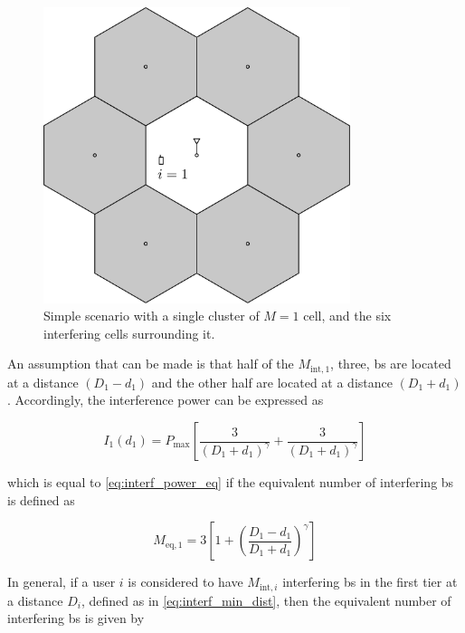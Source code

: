 \begin{figure}[t]
\begin{center}
    \includegraphics[width=0.8\textwidth]{./10.achievable_rates/img/cluster_1}
\end{center}
\caption{Simple scenario with a single cluster of $M = 1$ cell, and the six
    interfering cells surrounding it.}
\label{fig:cluster_1}
\end{figure}

An assumption that can be made is that half of the $M_{\text{int}, 1}$, \ie three, \gls{bs} are located at a distance $\left( D_1 - d_1 \right)$ and the
other half are located at a distance $\left( D_1 + d_1 \right)$. Accordingly,
the interference power can be expressed as

\begin{equation} \label{eq:interf_cluster_1}
    I_1\left(d_1\right) = P_{\max} \left[ \frac{3}{\left(D_1 + d_1
        \right)^\gamma} + \frac{3}{\left(D_1 + d_1 \right)^\gamma}\right]
\end{equation}

\noindent
which is equal to \eqref{eq:interf_power_eq} if the equivalent number of
interfering \gls{bs} is defined as

\begin{equation} \label{eq:meq_cluster_1}
    M_{\text{eq},1} = 3 \left[ 1 + \left(\frac{D_1 - d_1}{D_1 + d_1}
    \right)^\gamma\right]
\end{equation}

In general, if a user $i$ is considered to have $M_{\text{int}, i}$ interfering
\gls{bs} in the first tier at a distance $D_i$, defined as in
\eqref{eq:interf_min_dist}, then the equivalent number of interfering \gls{bs}
is given by

